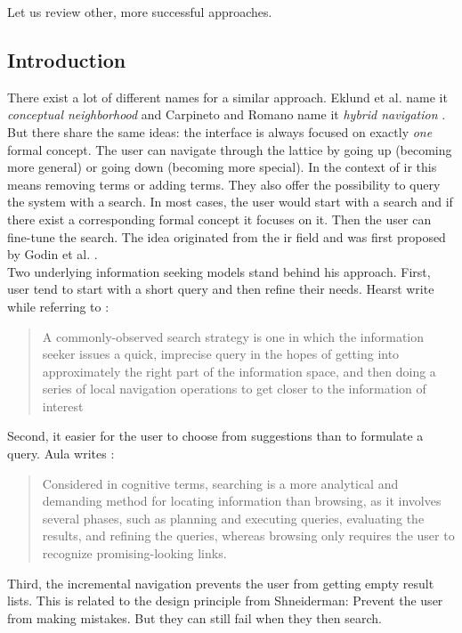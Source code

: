 \documentclass[11pt]{report}
\begin{document}
{{Let us review other, more successful approaches. \\

\subsection{Introduction}

There exist a lot of different names for a similar approach. Eklund et al. name it \textit{conceptual neighborhood}\cite{Eklund2009,Eklund2012} and Carpineto and Romano name it \textit{hybrid navigation} \cite{Carpineto1996}. But there share the same ideas: the interface is always focused on exactly \textit{one} formal concept. The user can navigate through the lattice by going up (becoming more general) or going down (becoming more special). In the context of \acrshort{ir} this means removing terms or adding terms. They also offer the possibility to query the system with a search. In most cases, the user would start with a search and if there exist a corresponding formal concept it focuses on it. Then the user can fine-tune the search. The idea originated from the \acrshort{ir} field and was first proposed by Godin et al. \cite{Godin1989}. \\

Two underlying information seeking models stand behind his approach. First, user tend to start with a short query and then refine their needs. Hearst \cite{Hearst2009} write  while referring to \cite{Marchionini2006,Bates1990}:
\begin{quote}
	A commonly-observed search strategy is one in which the information seeker issues a quick, imprecise query in the hopes of getting into approximately the right part of the information space, and then doing a series of local navigation operations to get closer to the information of interest
\end{quote}

Second, it easier for the user to choose from suggestions than to formulate a query. Aula writes \cite{Aula2005}:
\begin{quote}
	Considered in cognitive terms, searching is a more analytical and demanding method for locating information than browsing, as it involves several phases, such as planning and executing queries, evaluating the results, and refining the queries, whereas browsing only requires the user to recognize promising-looking links.
\end{quote}

Third, the incremental navigation prevents the user from getting empty result lists. This is related to the design principle from Shneiderman: Prevent the user from making mistakes. But they can still fail when they then search. \\

}}
\end{document}
